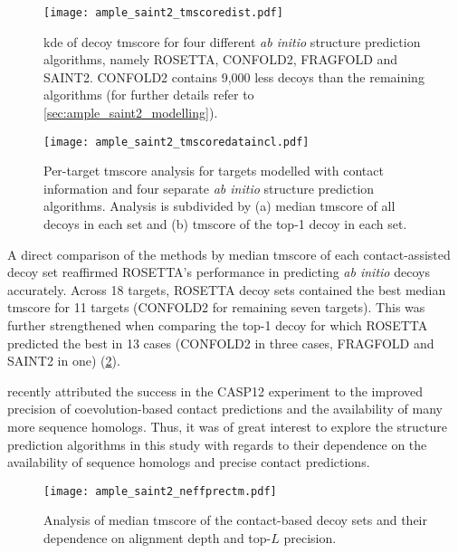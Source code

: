 \begin{figure}[H]
    \centering
    \texttt{[image: ample\_saint2\_tmscoredist.pdf]}
    \caption[Distribution of decoy TM-scores for four modelling algorithms]{\gls{kde} of decoy \gls{tmscore} for four different \textit{ab initio} structure prediction algorithms, namely ROSETTA, CONFOLD2, FRAGFOLD and SAINT2. CONFOLD2 contains 9,000 less decoys than the remaining algorithms (for further details refer to \cref{sec:ample_saint2_modelling}).}
    \label{fig:ample_saint2_tmscoredist}
\end{figure}

\begin{figure}[H]
    \centering
    \texttt{[image: ample\_saint2\_tmscoredataincl.pdf]}
    \caption[TM-score analysis for four modelling algorithms with contacts]{Per-target \gls{tmscore} analysis for targets modelled with contact information and four separate \textit{ab initio} structure prediction algorithms. Analysis is subdivided by (a) median \gls{tmscore} of all decoys in each set and (b) \gls{tmscore} of the top-1 decoy in each set.}
    \label{fig:ample_saint2_tmscoredataincl}
\end{figure}

A direct comparison of the methods by median \gls{tmscore} of each contact-assisted decoy set reaffirmed ROSETTA's performance in predicting \textit{ab initio} decoys accurately. Across 18 targets, ROSETTA decoy sets contained the best median \gls{tmscore} for 11 targets (CONFOLD2 for remaining seven targets). This was further strengthened when comparing the top-1 decoy for which ROSETTA predicted the best in 13 cases (CONFOLD2 in three cases, FRAGFOLD and SAINT2 in one) (\cref{fig:ample_saint2_tmscoredataincl}).

\textcite{Abriata2018-lu} recently attributed the success in the CASP12 experiment to the improved precision of coevolution-based contact predictions and the availability of many more sequence homologs. Thus, it was of great interest to explore the structure prediction algorithms in this study with regards to their dependence on the availability of sequence homologs and precise contact predictions.

\begin{figure}[H]
    \centering
    \texttt{[image: ample\_saint2\_neffprectm.pdf]}
    \caption[Analysis of alignment depth, precision and TM-scores]{Analysis of median \gls{tmscore} of the contact-based decoy sets and their dependence on  alignment depth and top-$L$ precision.}
    \label{fig:ample_saint2_neffprectm}
\end{figure}

